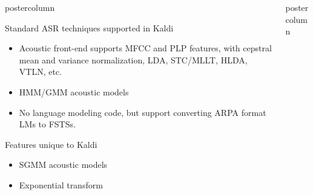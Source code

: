 \documentclass[final,hyperref={pdfpagelabels=false}]{beamer}
\newlength{\columnheight}
\begin{document}
\begin{frame}[fragile]
\begin{columns}
\begin{column}{.33\textwidth}
\begin{beamercolorbox}[center,wd=\textwidth]{postercolumn}
\begin{minipage}[T]{.95\textwidth}
{
            \vfill
            \begin{block}{Standard ASR techniques supported in Kaldi}
              \begin{itemize}
              \item Acoustic front-end supports MFCC and PLP features, with 
                cepstral mean and variance normalization, LDA, STC/MLLT, HLDA,
                VTLN, etc.
              \item HMM/GMM acoustic models 
              \item No language modeling code, but support converting ARPA 
                format LMs to FSTSs.
              \end{itemize}
            \end{block}
            \vfill
            \begin{block}{Features unique to Kaldi}
              \begin{itemize}
              \item SGMM acoustic models
              \item Exponential transform
              \end{itemize}
            \end{block}
          }
        \end{minipage}
      \end{beamercolorbox}
    \end{column}

    \begin{column}{.33\textwidth}
      \begin{beamercolorbox}[center,wd=\textwidth]{postercolumn}
        \begin{minipage}[T]{.95\textwidth} %
          \parbox[t][\columnheight]{\textwidth}{ %
            
}
\end{minipage}
\end{beamercolorbox}
\end{column}
\end{columns}
\end{frame}
\end{document}
